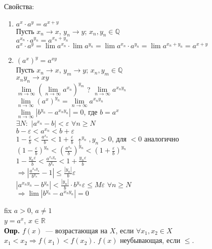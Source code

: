 \documentclass{article}
\begin{document}
	Свойства:
	\begin{enumerate}
		\item $a^x \cdot a^y = a^{x + y}$ \\
		Пусть $x_n \rightarrow x$, $y_n \rightarrow y$; $x_n, y_n \in \mathbb{Q}$ \\
		$a^{x_n} \cdot a^{y_n} = a^{x_n + y_n}$ \\
		$a^x \cdot a^y = \lim a^{x_n} \cdot \lim a^{y_n} = \lim a^{x_n} \cdot a^{y_n} = \lim a^{x_n + y_n} = a^{x + y}$
		\item $(a^x)^y = a^{xy}$ \\
		Пусть $x_n \rightarrow x$, $y_m \rightarrow y$; $x_n, y_m \in \mathbb{Q}$ \\
		$x_ny_n \rightarrow xy$ \\
		$\lim \limits_{m \rightarrow \infty} (\lim \limits_{n \rightarrow \infty} a^{x_n})^{y_m}$ ? $\lim \limits_{n \rightarrow \infty} a^{x_ny_n}$ \\
		$\lim \limits_{n \rightarrow \infty} (a^x)^{y_n} = \lim \limits_{n \rightarrow \infty} a^{x_ny_n}$ \\
		$\lim \limits_{n \rightarrow \infty} |b^{y_n} - a^{x_ny_n}| = 0$, где $b = a^x$ \\
		$\exists N:$ $|a^{x_n} - b| < \varepsilon$ $\forall n \geqslant N$ \\
		$b - \varepsilon < a^{x_n} < b + \varepsilon$ \\
		$1 - \frac{\varepsilon}{b} < \frac{a^{x_n}}{b} < 1 + \frac{\varepsilon}{b}$ $\uparrow ^{y_n}, y_n > 0$, для $< 0$ аналогично \\
		$(1 - \frac{\varepsilon}{b})^{y_n} < (\frac{a^{x_n}}{b})^{y_n} < (1 + \frac{\varepsilon}{b})^{y_n}$ \\
		$1 - \frac{y_n \varepsilon}{b} < \frac{a^{x_ny_n}}{b^{y_n}} < 1 + \frac{y_n \varepsilon}{b}$ \\
		$\Rightarrow |\frac{a^{x_ny_n}}{b^{y_n}} - 1| \leqslant \frac{|y_n|}{b} \varepsilon$ \\
		$|a^{x_ny_n} - b^{y_n}| < \frac{|y_n|}{b} \cdot b^{y_n} \varepsilon \leqslant M\varepsilon$ $\forall n \geqslant N$ \\
		$\Rightarrow \lim |b^{y_n} - a^{x_ny_n}| = 0$
	\end{enumerate}
	fix $a > 0$, $a \not= 1$ \\
	$y = a^x$, $x \in \mathbb{R}$ \\
	\textbf{Опр.} $f(x)$~--- возрастающая на $X$, если $\forall x_1, x_2 \in X$ $x_1 < x_2 \Rightarrow f(x_1) < f(x_2)$. $f(x)$ неубывающая, если $\leqslant$. \\
\end{document}

